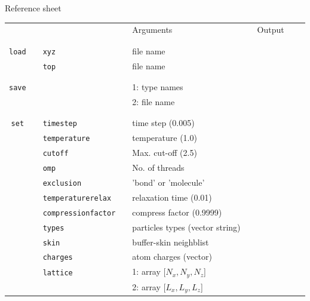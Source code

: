 \documentclass[11pt]{article}
\begin{document}
\begin{center}

  {\huge{Reference sheet}}
  
  \bigskip

  \bigskip
  
  \begin{tabular}{cclclcccc}
    {\color{red}{\textbf{Action}}} && {\color{blue}{Specifier}} && Arguments && Output \\
                                   && && && \\
    \hline
                                   && && && \\
    \verb!load! && \verb!xyz! && file name && \\
    $\mbox{}$ && \verb!top! && file name && \\
                                   && && && \\
    \hline
    && && && \\
    \verb!save! &&  && 1: type names && \\
                &&  && 2: file name && \\
                                   && && && \\
    \hline
                                   && && && \\
    \verb!set! && \verb!timestep! && time step (0.005) && \\
    $\mbox{}$  && \verb!temperature! && temperature (1.0) && \\
    $\mbox{}$  && \verb!cutoff! && Max. cut-off (2.5) && \\
    $\mbox{}$  && \verb!omp! && No. of threads && \\
    $\mbox{}$ && \verb!exclusion! && 'bond' or 'molecule' && \\
    $\mbox{}$ && \verb!temperaturerelax! && relaxation time (0.01) && \\
    $\mbox{}$ && \verb!compressionfactor! && compress factor (0.9999) && \\
    $\mbox{}$ && \verb!types! && particles types (vector string) && \\
    $\mbox{}$ && \verb!skin! && buffer-skin neighblist && \\
    $\mbox{}$ && \verb!charges! && atom charges (vector) && \\
    $\mbox{}$ && \verb!lattice! && 1: array [$N_x , N_y , N_z$] && \\
    $\mbox{}$ && $\mbox{}$      && 2: array [$L_x, L_y, L_z$] && \\

\end{tabular}
\end{center}
\end{document}
